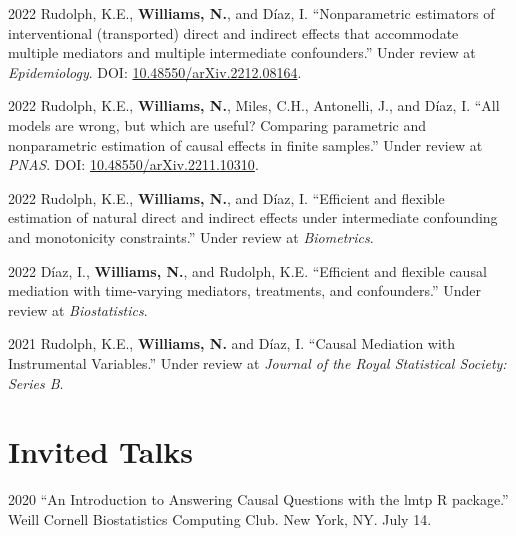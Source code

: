 \documentclass[12pt,letterpaper]{report}
\begin{document}
    \begin{tablist}
    
    \item[2022] \tab Rudolph, K.E., \textbf{Williams, N.}, and Díaz, I. \enquote{Nonparametric estimators of interventional (transported) direct and indirect effects that accommodate multiple mediators and multiple intermediate confounders.} Under review at \textit{Epidemiology}. DOI: \href{https://doi.org/10.48550/arXiv.2212.08164}{10.48550/arXiv.2212.08164}.
    
    \item[2022] \tab Rudolph, K.E., \textbf{Williams, N.}, Miles, C.H., Antonelli, J., and Díaz, I. \enquote{All models are wrong, but which are useful? Comparing parametric and nonparametric estimation of causal effects in finite samples.} Under review at \textit{PNAS}. DOI: \href{https://doi.org/10.48550/arXiv.2211.10310}{10.48550/arXiv.2211.10310}.
    
    \item[2022] \tab Rudolph, K.E., \textbf{Williams, N.}, and Díaz, I. \enquote{Efficient and flexible estimation of natural direct and indirect effects under intermediate confounding and monotonicity constraints.} Under review at \textit{Biometrics}.
    
    \item[2022] \tab Díaz, I., \textbf{Williams, N.}, and Rudolph, K.E. \enquote{Efficient and flexible causal mediation with time-varying mediators, treatments, and confounders.} Under review at \textit{Biostatistics}.
    
    \item[2021] \tab Rudolph, K.E., \textbf{Williams, N.} and Díaz, I. \enquote{Causal Mediation with Instrumental Variables.} Under review at \textit{Journal of the Royal Statistical Society: Series B}.
    
    \end{tablist}

    \section*{Invited Talks}

    \begin{tablist}

        \item[2020] \tab \enquote{An Introduction to Answering Causal Questions with the lmtp R package.} Weill Cornell Biostatistics Computing Club. New York, NY. July 14.

    \end{tablist}
    
\end{document}
